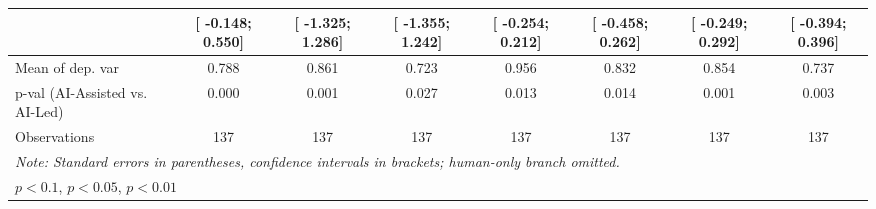 \begin{tabular}{l*{7}{c}}
                    &[   -0.148;     0.550]   &[   -1.325;     1.286]   &[   -1.355;     1.242]   &[   -0.254;     0.212]   &[   -0.458;     0.262]   &[   -0.249;     0.292]   &[   -0.394;     0.396]   \\
\hline
Mean of dep. var    &    0.788   &    0.861   &    0.723   &    0.956   &    0.832   &    0.854   &    0.737   \\
p-val (AI-Assisted vs. AI-Led)&    0.000   &    0.001   &    0.027   &    0.013   &    0.014   &    0.001   &    0.003   \\
Observations        &137   &137   &137   &137   &137   &137   &137   \\
\hline\hline
\multicolumn{8}{l}{\it{Note:} Standard errors in parentheses, confidence intervals in brackets; human-only branch omitted.}\\
\multicolumn{8}{l}{\sym{*} \(p<0.1\), \sym{**} \(p<0.05\), \sym{***} \(p<0.01\)}\\
\end{tabular}
